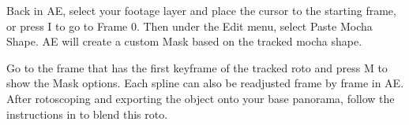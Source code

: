 \begin{fullwidth}


Back in AE, select your footage layer and place the cursor to the starting frame, or press I to go to Frame 0. Then under the Edit menu, select Paste Mocha Shape. AE will create a custom Mask based on the tracked mocha shape. 


Go to the frame that has the first keyframe of the tracked roto and press M to show the Mask options. Each spline can also be readjusted frame by frame in AE. After rotoscoping and exporting the object onto your base panorama, follow the instructions in \textbf{} to blend this roto.


\clearpage
\end{fullwidth}